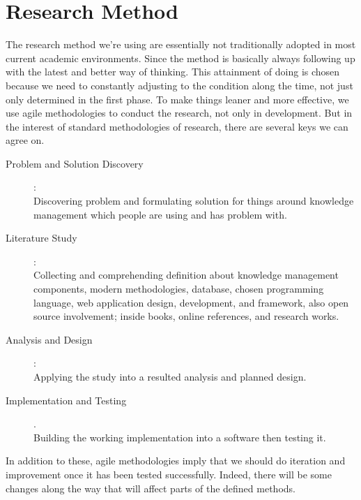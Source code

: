 \section{Research Method}
\label{sec:research-method}

The research method we're using are essentially not traditionally adopted in most current academic environments.
Since the method is basically always following up with the latest and better way of thinking.
This attainment of doing is chosen because we need to constantly adjusting to the condition along the time, not just only determined in the first phase.
To make things leaner and more effective, we use agile methodologies to conduct the research, not only in development.
But in the interest of standard methodologies of research, there are several keys we can agree on.

\begin{description}
\item [Problem and Solution Discovery]: \hfill \\
Discovering problem and formulating solution for things around knowledge management which people are using and has problem with.
\item [Literature Study]: \hfill \\
Collecting and comprehending definition about knowledge management components, modern methodologies, database, chosen programming language, web application design, development, and framework, also open source involvement; inside books, online references, and research works.
\item [Analysis and Design]: \hfill \\
Applying the study into a resulted analysis and planned design.
\item [Implementation and Testing]. \hfill \\
Building the working implementation into a software then testing it.
\end{description}

In addition to these, agile methodologies imply that we should do iteration and improvement once it has been tested successfully.
Indeed, there will be some changes along the way that will affect parts of the defined methods.
